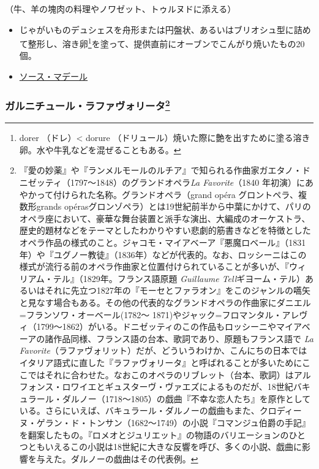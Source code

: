 \begin{recette}
（牛、羊の塊肉の料理やノワゼット、トゥルヌドに添える）

\begin{itemize}
\item
  じゃがいものデュシェスを舟形または円盤状、あるいはブリオシュ型に詰めて整形し、溶き卵\footnote{dorer
    （ドレ）\textless{} dorure
    （ドリュール）焼いた際に艶を出すために塗る溶き卵。水や牛乳などを混ぜることもある。}を塗って、提供直前にオーブンでこんがり焼いたもの20個。
\item
  \protect\hyperlink{sauce-madere}{ソース・マデール}
\end{itemize}

\hypertarget{garniture-a-la-favorite}{%
\subsubsection[ガルニチュール・ラファヴォリータ]{\texorpdfstring{ガルニチュール・ラファヴォリータ\footnote{『愛の妙薬』や『ランメルモールのルチア』で知られる作曲家ガエタノ・ドニゼッティ（1797〜1848）のグランドオペラ\emph{La
  Favorite}（1840
  年初演）にあやかって付けられた名称。グランドオペラ（grand opéra
  グロントペラ、複数形grands
  opérasグロンゾペラ）とは19世紀前半から中葉にかけて、パリのオペラ座において、豪華な舞台装置と派手な演出、大編成のオーケストラ、歴史的題材などをテーマとしたわかりやすい悲劇的筋書きなどを特徴としたオペラ作品の様式のこと。ジャコモ・マイアベーア『悪魔ロベール』（1831年）や『ユグノー教徒』（1836年）などが代表的。なお、ロッシーニはこの様式が流行る前のオペラ作曲家と位置付けられていることが多いが、『ウィリアム・テル』（1829年。フランス語原題
  \emph{Guillaume
  Tell}ギヨーム・テル）あるいはそれに先立つ1827年の『モーセとファラオン』をこのジャンルの嚆矢と見なす場合もある。その他の代表的なグランドオペラの作曲家にダニエル=フランソワ・オーベール(1782〜
  1871)やジャック=フロマンタル・アレヴィ（1799〜1862）がいる。ドニゼッティのこの作品もロッシーニやマイアベーアの諸作品同様、フランス語の台本、歌詞であり、原題もフランス語で
  \emph{La
  Favorite}（ラファヴォリット）だが、どういうわけか、こんにちの日本ではイタリア語式に直した『ラファヴォリータ』と呼ばれることが多いためにここではそれに合わせた。なおこのオペラのリブレット（台本、歌詞）はアルフォンス・ロワイエとギュスターヴ・ヴァエズによるものだが、18世紀バキュラール・ダルノー（1718〜1805）の戯曲『不幸な恋人たち』を原作としている。さらにいえば、バキュラール・ダルノーの戯曲もまた、クロディーヌ・ゲラン・ド・トンサン（1682〜1749）の小説『コマンジュ伯爵の手記』を翻案したもの。『ロメオとジュリエット』の物語のバリエーションのひとつともいえるこの小説は18世紀に大きな反響を呼び、多くの小説、戯曲に影響を与えた。ダルノーの戯曲はその代表例。}}{ガルニチュール・ラファヴォリータ}}\label{garniture-a-la-favorite}}


\end{recette}
